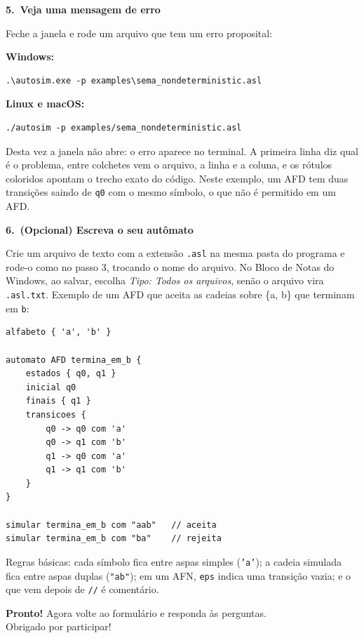 \documentclass[11pt,a4paper]{article}
\newcommand{\passo}[2]{%
  \par\medskip
  {\large\bfseries\color{acento}#1.\ #2}\par\smallskip
}
\begin{document}
\passo{5}{Veja uma mensagem de erro}

Feche a janela e rode um arquivo que tem um erro proposital:

\textbf{Windows:}
\begin{lstlisting}
.\autosim.exe -p examples\sema_nondeterministic.asl
\end{lstlisting}

\textbf{Linux e macOS:}
\begin{lstlisting}
./autosim -p examples/sema_nondeterministic.asl
\end{lstlisting}

Desta vez a janela não abre: o erro aparece no terminal. A primeira linha diz qual é o
problema, entre colchetes vem o arquivo, a linha e a coluna, e os rótulos coloridos apontam
o trecho exato do código. Neste exemplo, um AFD tem duas transições saindo de \texttt{q0}
com o mesmo símbolo, o que não é permitido em um AFD.

\newpage
\passo{6}{(Opcional) Escreva o seu autômato}

Crie um arquivo de texto com a extensão \texttt{.asl} na mesma pasta do programa e rode-o
como no passo 3, trocando o nome do arquivo. No Bloco de Notas do Windows, ao salvar,
escolha \emph{Tipo: Todos os arquivos}, senão o arquivo vira \texttt{.asl.txt}. Exemplo de um AFD que aceita as cadeias
sobre \{a, b\} que terminam em \texttt{b}:

\begin{lstlisting}
alfabeto { 'a', 'b' }

automato AFD termina_em_b {
    estados { q0, q1 }
    inicial q0
    finais { q1 }
    transicoes {
        q0 -> q0 com 'a'
        q0 -> q1 com 'b'
        q1 -> q0 com 'a'
        q1 -> q1 com 'b'
    }
}

simular termina_em_b com "aab"   // aceita
simular termina_em_b com "ba"    // rejeita
\end{lstlisting}

Regras básicas: cada símbolo fica entre aspas simples (\texttt{'a'}); a cadeia simulada
fica entre aspas duplas (\texttt{\string"ab\string"}); em um AFN, \texttt{eps} indica uma transição vazia;
e o que vem depois de \texttt{//} é comentário.

\vfill
\begin{center}
  \colorbox{acento!10}{\parbox{0.9\textwidth}{\centering\smallskip
  \textbf{Pronto!} Agora volte ao formulário e responda às perguntas.\\
  Obrigado por participar!\smallskip}}
\end{center}
\end{document}
